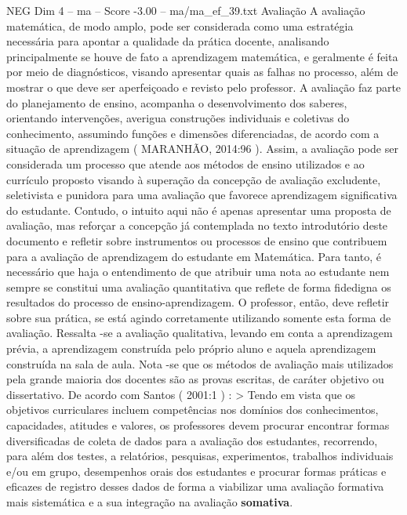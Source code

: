 \begin{textsample}{NEG Dim 4 – ma – Score -3.00 – ma/ma\_ef\_39.txt}  \label{ex:f4_neg_235}
Avaliação A avaliação matemática, de modo amplo, pode ser considerada como uma estratégia necessária para apontar a qualidade da prática docente, analisando principalmente se houve de fato a aprendizagem matemática, e geralmente é feita por meio de diagnósticos, visando apresentar quais as falhas no processo, além de mostrar o que deve ser aperfeiçoado e revisto pelo professor.
A avaliação faz parte do planejamento de ensino, acompanha o desenvolvimento dos saberes, orientando intervenções, averigua construções individuais e coletivas do conhecimento, assumindo funções e dimensões diferenciadas, de acordo com a situação de aprendizagem ( MARANHÃO, 2014:96 ).
Assim, a avaliação pode ser considerada um processo que atende aos métodos de ensino utilizados e ao currículo proposto visando à superação da concepção de avaliação excludente, seletivista e punidora para uma avaliação que favorece aprendizagem significativa do estudante.
Contudo, o intuito aqui não é apenas apresentar uma proposta de avaliação, mas reforçar a concepção já contemplada no texto introdutório deste documento e refletir sobre instrumentos ou processos de ensino que contribuem para a avaliação de aprendizagem do estudante em Matemática.
Para tanto, é necessário que haja o entendimento de que atribuir uma nota ao estudante nem sempre se constitui uma avaliação quantitativa que reflete de forma fidedigna os resultados do processo de ensino-aprendizagem.
O professor, então, deve refletir sobre sua prática, se está agindo corretamente utilizando somente esta forma de avaliação.
Ressalta -se a avaliação qualitativa, levando em conta a aprendizagem prévia, a aprendizagem construída pelo próprio aluno e aquela aprendizagem construída na sala de aula.
Nota -se que os métodos de avaliação mais utilizados pela grande maioria dos docentes são as provas escritas, de caráter objetivo ou dissertativo.
De acordo com Santos ( 2001:1 ) : > Tendo em vista que os objetivos curriculares incluem competências nos domínios dos conhecimentos, capacidades, atitudes e valores, os professores devem procurar encontrar formas diversificadas de coleta de dados para a avaliação dos estudantes, recorrendo, para além dos testes, a relatórios, pesquisas, experimentos, trabalhos individuais e/ou em grupo, desempenhos orais dos estudantes e procurar formas práticas e eficazes de registro desses dados de forma a viabilizar uma avaliação formativa mais sistemática e a sua integração na avaliação \textbf{somativa}.

\end{textsample}
